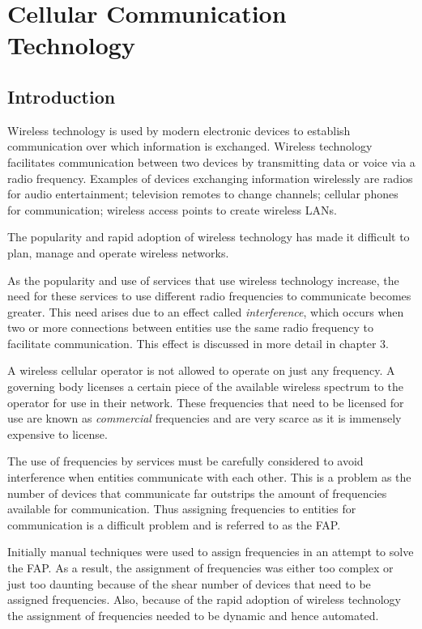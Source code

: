 \chapter{Cellular Communication Technology}
\label{chpt:celltech}
\section{Introduction}
 Wireless technology is used by modern electronic devices to establish communication over which information is exchanged\cite{Karen2004}. Wireless technology facilitates communication between two devices by transmitting data or voice via a radio frequency\cite{Karen2004}. Examples of devices exchanging information wirelessly are radios for audio entertainment; television remotes to change channels; cellular phones for communication; wireless access points to create wireless LANs\cite{Karen2004}.

The popularity and rapid adoption of wireless technology has made it difficult to plan, manage and operate wireless networks\cite{Karen2004}. 

As the popularity and use of services that use wireless technology increase, the need for these services to use different radio frequencies to communicate becomes greater\cite{wirelesstelcoMullet}. This need arises due to an effect called \emph{interference}, which occurs when two or more connections between entities use the same radio frequency to facilitate communication\cite{wirelesstelcoMullet}. This effect is discussed in more detail in chapter 3.

A wireless cellular operator is not allowed to operate on just any frequency. A governing body licenses a certain piece of the available wireless spectrum to the operator for use in their network\cite{FAPRAMColouring}. These frequencies that need to be licensed for use are known as \emph{commercial} frequencies and are very scarce as it is immensely expensive to license\cite{FAPRAMColouring}. 

The use of frequencies by services must be carefully considered to avoid interference when entities communicate with each other. This is a problem as the number of devices that communicate far outstrips the amount of frequencies available for communication\cite{wirelesstelcoMullet}. Thus assigning frequencies to entities for communication is a difficult problem and is referred to as the \gls{FAP}\cite{Karen2004,Eisenblatter}.

Initially manual techniques were used to assign frequencies in an attempt to solve the \gls{FAP}\cite{Karen2004}. As a result, the assignment of frequencies was either too complex or just too daunting because of the shear number of devices that need to be assigned frequencies\cite{Karen2004}. Also, because of the rapid adoption of wireless technology the assignment of frequencies needed to be dynamic and hence automated\cite{Karen2004}.

